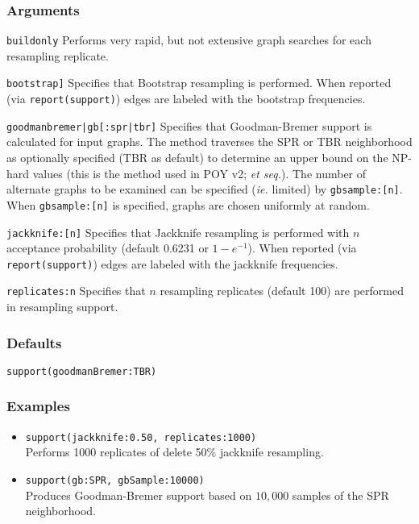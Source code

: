 \documentclass[11pt]{article}
\begin{document}
		\subsubsection{Arguments}
		\noindent \texttt{buildonly} Performs very rapid, but not extensive graph searches for each resampling replicate.
		
		\smallskip		
		\noindent \texttt{bootstrap]} Specifies that Bootstrap resampling is performed.  When reported (via \texttt{report(support)}) edges are labeled with the bootstrap frequencies.
		
		\smallskip		
		\noindent \texttt{goodmanbremer|gb[:spr|tbr]} Specifies that Goodman-Bremer support is calculated for 
		input graphs.  The method traverses the SPR or TBR neighborhood as optionally specified (TBR as default) 
		to determine an upper bound on the NP-hard values (this is the method used in POY v2; \citealp{POY2} \textit{et seq.}).  The number of alternate graphs to be examined 
		can be specified (\textit{ie.} limited)  by \texttt{gbsample:[n]}.  When  \texttt{gbsample:[n]} is specified, 
		graphs are chosen uniformly at random.
		
		
		\smallskip		
		\noindent \texttt{jackknife:[n]} Specifies that Jackknife resampling is performed with $n$ acceptance probability
		(default 0.6231 or $1 - e^{-1}$).  When reported (via \texttt{report(support)}) edges are labeled with the jackknife frequencies.
		
		\smallskip		
		\noindent \texttt{replicates:n} Specifies that $n$ resampling replicates  (default 100) are performed 
		in resampling support.
		
		\subsubsection{Defaults}
		\texttt{support(goodmanBremer:TBR)}
		
		\subsubsection{Examples}
		\begin{itemize}
			\item{\texttt{support(jackknife:0.50, replicates:1000)}\\Performs 1000 replicates of delete 50\% jackknife resampling.}
			\item{\texttt{support(gb:SPR, gbSample:10000)}\\Produces Goodman-Bremer support based on $10,000$ samples of 
				the SPR neighborhood.}
			
		\end{itemize}
	
\end{document}
